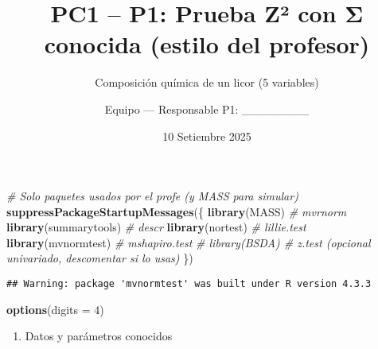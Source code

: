 \documentclass[
]{article}
\title{PC1 -- P1: Prueba Z² con Σ conocida (estilo del profesor)}
\subtitle{Composición química de un licor (5 variables)}
\author{Equipo --- Responsable P1: \_\_\_\_\_\_\_\_}
\date{10 Setiembre 2025}
\newenvironment{Shaded}{\begin{snugshade}}{\end{snugshade}}
\newcommand{\AttributeTok}[1]{\textcolor[rgb]{0.13,0.29,0.53}{#1}}
\newcommand{\CommentTok}[1]{\textcolor[rgb]{0.56,0.35,0.01}{\textit{#1}}}
\newcommand{\DecValTok}[1]{\textcolor[rgb]{0.00,0.00,0.81}{#1}}
\newcommand{\FunctionTok}[1]{\textcolor[rgb]{0.13,0.29,0.53}{\textbf{#1}}}
\newcommand{\NormalTok}[1]{#1}
\providecommand{\tightlist}{%
  \setlength{\itemsep}{0pt}\setlength{\parskip}{0pt}}
\begin{document}
\maketitle

{
\setcounter{tocdepth}{3}
\tableofcontents
}
\begin{Shaded}
\begin{Highlighting}[]
\CommentTok{\# Solo paquetes usados por el profe (y MASS para simular)}
\FunctionTok{suppressPackageStartupMessages}\NormalTok{(\{}
  \FunctionTok{library}\NormalTok{(MASS)          }\CommentTok{\# mvrnorm}
  \FunctionTok{library}\NormalTok{(summarytools)  }\CommentTok{\# descr}
  \FunctionTok{library}\NormalTok{(nortest)       }\CommentTok{\# lillie.test}
  \FunctionTok{library}\NormalTok{(mvnormtest)    }\CommentTok{\# mshapiro.test}
  \CommentTok{\# library(BSDA)        \# z.test (opcional univariado, descomentar si lo usas)}
\NormalTok{\})}
\end{Highlighting}
\end{Shaded}

\begin{verbatim}
## Warning: package 'mvnormtest' was built under R version 4.3.3
\end{verbatim}

\begin{Shaded}
\begin{Highlighting}[]
\FunctionTok{options}\NormalTok{(}\AttributeTok{digits =} \DecValTok{4}\NormalTok{)}
\end{Highlighting}
\end{Shaded}

\begin{enumerate}
\def\labelenumi{\arabic{enumi})}
\tightlist
\item
  Datos y parámetros conocidos
\end{enumerate}
\end{document}
